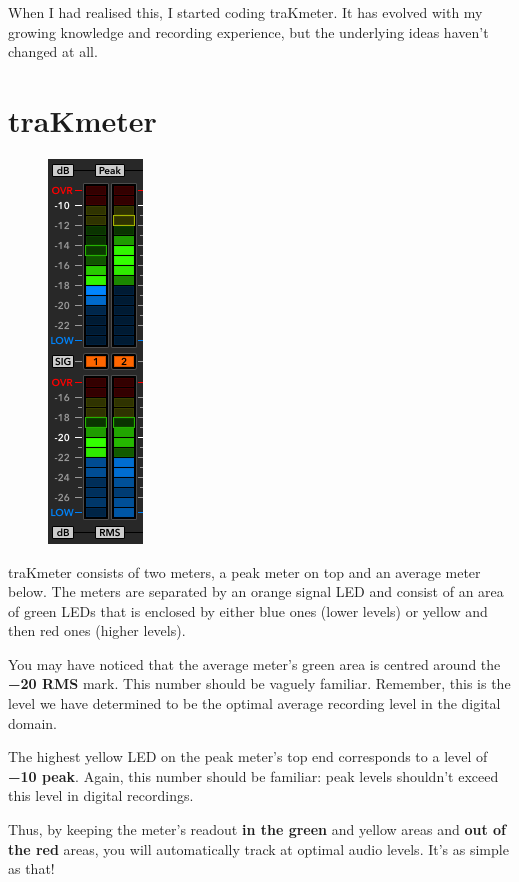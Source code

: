 When I had realised this, I started coding traKmeter.  It has evolved
with my growing knowledge and recording experience, but the underlying
ideas haven't changed at all.

\chapter{traKmeter}
\label{chap:trakmeter}

\begin{figure}
\includegraphics[scale=0.69,clip]{include/images/level_meter_complete.png}
\end{figure}

traKmeter consists of two meters, a peak meter on top and an average
meter below.  The meters are separated by an orange signal LED and
consist of an area of green LEDs that is enclosed by either blue ones
(lower levels) or yellow and then red ones (higher levels).

You may have noticed that the average meter's green area is centred
around the \textbf{\SI{-20}{\dBFS} RMS} mark.  This number should be
vaguely familiar.  Remember, this is the level we have determined to
be the optimal average recording level in the digital domain.

The highest yellow LED on the peak meter's top end corresponds to a
level of \textbf{\SI{-10}{\dBFS} peak}.  Again, this number should be
familiar: peak levels shouldn't exceed this level in digital
recordings.

Thus, by keeping the meter's readout \textbf{in the green} and yellow
areas and \textbf{out of the red} areas, you will automatically track
at optimal audio levels.  It's as simple as that!

